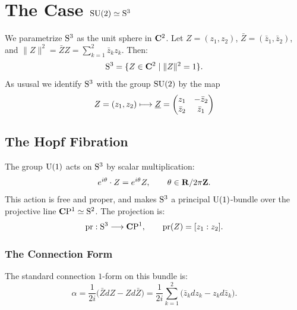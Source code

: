\documentclass[11pt,reqno,letterpaper,twoside]{amsart}
\newcommand{\barZ}{\bar Z}
\begin{document}
  \section{The Case $\mathrm{SU}(2) \simeq \mathrm{S}^3$}
  
  We parametrize $\mathrm{S}^3$ as the unit sphere in ${\mathbf{C}}^2$.
  Let $Z = (z_1, z_2)$,
  $\barZ = (\bar{z}_1, \bar{z}_2)$,
  and $\|Z\|^2 = \barZ Z = \sum_{k=1}^2 \bar{z}_k z_k$.
  Then:
  \[
    \mathrm{S}^3 = \{ Z \in {\mathbf{C}}^2 \mid \|Z\|^2 = 1 \}.
    \]
  As ususal we identify $\mathrm{S}^3$ with the group $\mathrm{SU}(2)$ by the map
  $$
    Z = (z_1, z_2) \longmapsto \uline{Z} = \Matrix{z_1 & - \bar z_2 \\ \bar z_2 & \bar z_1}
    $$
  
  \subsection{The Hopf Fibration}
  
  The group $\mathrm{U}(1)$ acts on $\mathrm{S}^3$ by scalar multiplication:
  \[
    e^{i\theta} \cdot Z = e^{i\theta} Z, %
    \qquad \theta \in \RR / 2\pi\ZZ.
    \]
  This action is free and proper,
  and makes $\mathrm{S}^3$ a principal $\mathrm{U}(1)$-bundle over the projective line
  ${\mathbf{C}}\mathrm{P}^1 \simeq \mathrm{S}^2$.
  The projection is:
  \[
    \pr: \Sph^3 \longrightarrow \CC\mathrm{P}^1,
    \qquad
    \pr(Z) = [z_1 : z_2].
    \]
  
  \subsubsection{The Connection Form}
  
  The standard connection $1$-form on this bundle is:
  \[
    \alpha = \frac{1}{2i} \bigl( \barZ dZ - Z d\barZ \bigr)
    = \frac{1}{2i} \sum_{k=1}^2 \bigl( \bar{z}_k dz_k - z_k d\bar{z}_k \bigr).
    \]
  
\end{document}
